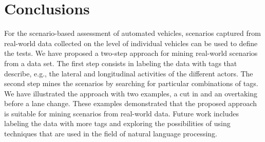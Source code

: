 \section{Conclusions}
\label{sec:conclusions}

\cstarte
For the scenario-based assessment of automated vehicles, scenarios captured from real-world data collected on the level of individual vehicles can be used to define the tests.
We have proposed a two-step approach for mining real-world scenarios from a data set.
The first step consists in labeling the data with tags that describe, e.g., the lateral and longitudinal activities of the different actors.
The second step mines the scenarios by searching for particular combinations of tags.
We have illustrated the approach with two examples, a cut in and an overtaking before a lane change. \cende
\cstartf These examples demonstrated that the proposed approach is suitable for mining scenarios from real-world data.
Future work includes labeling the data with more tags and exploring the possibilities of using techniques that are used in the field of natural language processing.
\cendf
